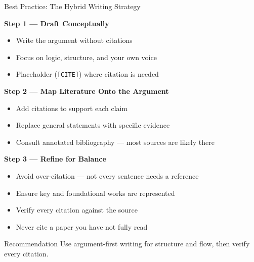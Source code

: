 \documentclass{beamer}
\begin{document}
\begin{frame}{Best Practice: The Hybrid Writing Strategy}

  \footnotesize
  \textbf{Step 1 --- Draft Conceptually}
  \begin{itemize}
    \item Write the argument without citations
    \item Focus on logic, structure, and your own voice
    \item Placeholder (\texttt{[CITE]}) where citation is needed
  \end{itemize}

  \medskip
  \textbf{Step 2 --- Map Literature Onto the Argument}
  \begin{itemize}
    \item Add citations to support each claim
    \item Replace general statements with specific evidence
    \item Consult annotated bibliography ---
      most sources are likely there
  \end{itemize}

  \medskip
  \textbf{Step 3 --- Refine for Balance}
  \begin{itemize}
    \item Avoid over-citation --- not every sentence
      needs a reference
    \item Ensure key and foundational works are represented
    \item Verify every citation against the source
    \item Never cite a paper you have not fully read
  \end{itemize}

  \medskip
  \begin{block}{Recommendation}
    Use argument-first writing for structure and flow,
    then verify every citation.
  \end{block}

\end{frame}



\end{document}
